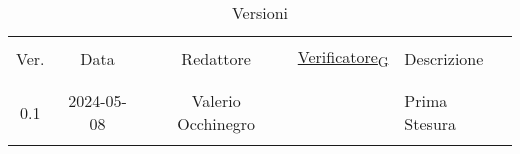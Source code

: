 \documentclass[italian,12pt]{article}
\begin{document}

\newpage


\begin{table}[!h]
	\caption*{Versioni}
	\begin{center}
		\begin{tabular}{ c c c c p{6.1cm} }
			\hline                                                                                                 \\[-2ex]
			Ver. & Data       & Redattore          & \href{https://7last.github.io/docs/pb/documentazione-interna/glossario\#verificatore}{Verificatore\textsubscript{G}}      & Descrizione                                    \\
			\\[-2ex] \hline \\[-1.5ex]
			0.1  & 2024-05-08 & Valerio Occhinegro &                   & Prima Stesura \\
			\\[-1.5ex] \hline
		\end{tabular}
	\end{center}
\end{table}

\newpage
\tableofcontents
\listoftables
\listoffigures
\newpage












\end{document}
